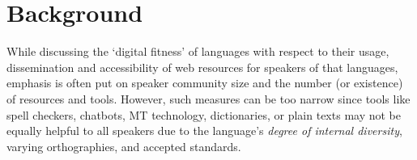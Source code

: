 \section{Background}

While discussing the `digital fitness' of languages \cite{soria2016fostering}
with respect to their usage, dissemination and accessibility of web resources for speakers of that languages, emphasis is often put on speaker community size and the number (or existence) of resources and tools. However, such measures can be too narrow since tools like spell checkers, chatbots, MT technology, dictionaries, or plain texts may not be equally  helpful to all speakers due to the language's \emph{degree of internal diversity}, varying orthographies, and accepted standards.
